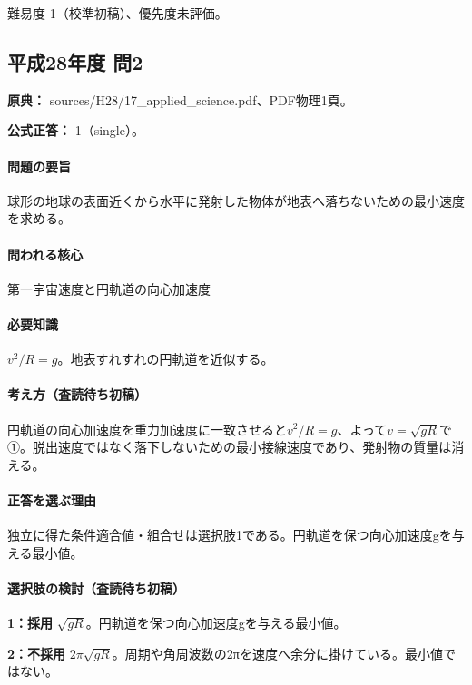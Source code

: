 \par 難易度 1（校準初稿）、優先度未評価。

\subsection{平成28年度 問2}
\label{q:h28-reg-applied-02}

\noindent\textbf{原典：} sources/H28/17\_applied\_science.pdf、PDF物理1頁。

\textbf{公式正答：} 1（single）。

\paragraph{問題の要旨} 球形の地球の表面近くから水平に発射した物体が地表へ落ちないための最小速度を求める。

\paragraph{問われる核心} 第一宇宙速度と円軌道の向心加速度

\paragraph{必要知識} \(v^2/R=g\)。地表すれすれの円軌道を近似する。

\paragraph{考え方（査読待ち初稿）} 円軌道の向心加速度を重力加速度に一致させると\(v^2/R=g\)、よって\(v=\sqrt{gR}\)で①。脱出速度ではなく落下しないための最小接線速度であり、発射物の質量は消える。

\paragraph{正答を選ぶ理由} 独立に得た条件適合値・組合せは選択肢1である。円軌道を保つ向心加速度gを与える最小値。

\paragraph{選択肢の検討（査読待ち初稿）}\mbox{}\par

\noindent\textbf{1：採用} \(\sqrt{gR}\)。円軌道を保つ向心加速度gを与える最小値。\par

\noindent\textbf{2：不採用} \(2\pi\sqrt{gR}\)。周期や角周波数の2πを速度へ余分に掛けている。最小値ではない。\par

